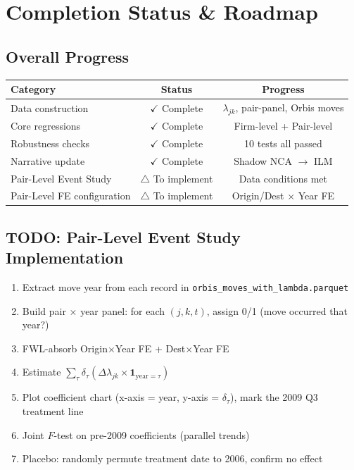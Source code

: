 \documentclass[11pt,a4paper]{article}
\begin{document}
\newpage

\section{Completion Status \& Roadmap}

\subsection{Overall Progress}

\begin{table}[h!]
\centering
\begin{tabular}{lcc}
\toprule
\textbf{Category} & \textbf{Status} & \textbf{Progress} \\
\midrule
Data construction & \(\checkmark\) Complete & \(\lambda_{jk}\), pair-panel, Orbis moves \\
Core regressions & \(\checkmark\) Complete & Firm-level + Pair-level \\
Robustness checks & \(\checkmark\) Complete & 10 tests all passed \\
Narrative update & \(\checkmark\) Complete & Shadow NCA \(\rightarrow\) ILM \\
\midrule
Pair-Level Event Study & \(\triangle\) To implement & Data conditions met \\
Pair-Level FE configuration & \(\triangle\) To implement & Origin/Dest \(\times\) Year FE \\
\bottomrule
\end{tabular}
\end{table}

\subsection{TODO: Pair-Level Event Study Implementation}

\begin{enumerate}[leftmargin=*]
  \item Extract move year from each record in \texttt{orbis\_moves\_with\_lambda.parquet}
  \item Build pair \(\times\) year panel: for each \((j, k, t)\), assign 0/1 (move occurred that year?)
  \item FWL-absorb Origin\(\times\)Year FE + Dest\(\times\)Year FE
  \item Estimate \(\sum_\tau \delta_\tau (\Delta\lambda_{jk} \times \mathbf{1}_{\text{year}=\tau})\)
  \item Plot coefficient chart (x-axis = year, y-axis = \(\delta_\tau\)), mark the 2009 Q3 treatment line
  \item Joint \(F\)-test on pre-2009 coefficients (parallel trends)
  \item Placebo: randomly permute treatment date to 2006, confirm no effect
\end{enumerate}
\end{document}
